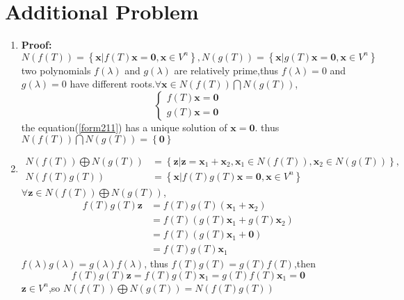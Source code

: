 \documentclass[12pt,a4paper]{article}
\begin{document}
\section{Additional Problem}
\begin{enumerate}[(1)]
	\item \textbf{Proof:} 
		 \[N(f(T)) = \left\lbrace \bm{x}|f(T)\bm{x} = \bm{0},\bm{x} \in V^{n}\right \rbrace, 
			N(g(T)) = \left\lbrace \bm{x}|g(T)\bm{x} = \bm{0},\bm{x} \in V^{n}\right \rbrace
	   	\]
	two polynomials $f(\lambda)$ and $g(\lambda)$ are relatively prime,thus $f(\lambda) = 0$ and $g(\lambda) = 0$
	have different roots.$\forall \bm{x} \in N(f(T))\bigcap N(g(T))$,
	\begin{equation}
	\label{form211}
	\left\lbrace 
	\begin{aligned} 
	f(T)\bm{x} = \bm{0}\\
	g(T)\bm{x} = \bm{0} 
	\end{aligned} \right .  
	\end{equation} 
	the equation(\ref{form211}) has a unique solution of $\bm{x} = \bm{0}$.	
	thus $N(f(T)) \bigcap N(g(T)) = \left\lbrace \bm{0}\right\rbrace$	
			
   \item \[\begin{aligned}
   N(f(T)) \bigoplus N(g(T)) &= \left\lbrace \bm{z}|\bm{z} = \bm{x}_1 + \bm{x}_2, 
   \bm{x}_1\in N(f(T)),\bm{x}_2\in N(g(T))    \right\rbrace ,\\
   N(f(T)g(T)) &= \left\lbrace \bm{x}|f(T)g(T)\bm{x} = \bm{0},\bm{x}\in V^{n}\right\rbrace 
   \end{aligned} 
   \]
   $\forall \bm{z} \in  N(f(T)) \bigoplus N(g(T))$,
   \[
   \begin{split} 
	  f(T)g(T)\bm{z} &=  f(T)g(T)(\bm{x}_1 + \bm{x}_2)  \\
	&= f(T)(g(T)\bm{x}_1 + g(T)\bm{x}_2 ) \\
	&= f(T)(g(T)\bm{x}_1 + \bm{0}) \\
	&= f(T)g(T)\bm{x}_1
	\end{split} 
   \]
   $f(\lambda)g(\lambda) = g(\lambda)f(\lambda)$, thus $f(T)g(T) = g(T)f(T)$,then
   \[
   f(T)g(T)\bm{z} = f(T)g(T)\bm{x}_1 = g(T)f(T)\bm{x}_1 = \bm{0}
   \]
   $\bm{z} \in V^{n}$,so $N(f(T)) \bigoplus N(g(T)) = N(f(T)g(T)) $
   
   
\end{enumerate}
\end{document}
